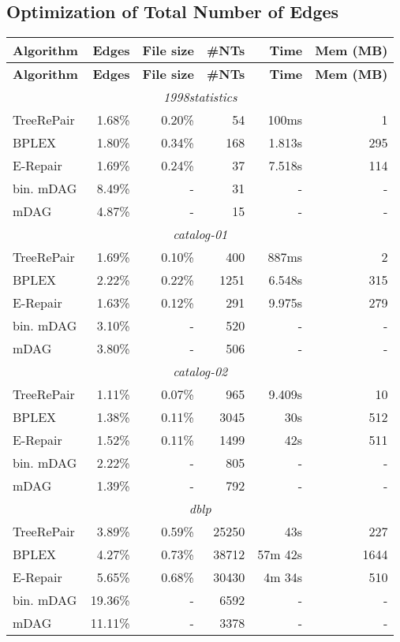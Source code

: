 \documentclass[12pt]{llncs}
\begin{document}
\subsection{Optimization of Total Number of Edges}\label{sec:detailedResultsOptimizationEdges}

\begin{longtable}{lrrrrr}
			\toprule
\textbf{Algorithm}&\textbf{Edges}&\textbf{File size}&\textbf{\#NTs}&\textbf{Time}&\textbf{Mem (MB)}\\\midrule
\endhead
			\toprule
\textbf{Algorithm}&\textbf{Edges}&\textbf{File size}&\textbf{\#NTs}&\textbf{Time}&\textbf{Mem (MB)}\\
\endfirsthead
			\midrule\multicolumn{6}{c}{\emph{1998statistics}}\\*
			TreeRePair&1.68\%&0.20\%&54&100ms&1\\*
			BPLEX&1.80\%&0.34\%&168&1.813s&295\\*
			E-Repair&1.69\%&0.24\%&37&7.518s&114\\*
			bin. mDAG&8.49\%&-&31&-&-\\*
			mDAG&4.87\%&-&15&-&-\\
			\midrule\multicolumn{6}{c}{\emph{catalog-01}}\\*
			TreeRePair&1.69\%&0.10\%&400&887ms&2\\*
			BPLEX&2.22\%&0.22\%&1251&6.548s&315\\*
			E-Repair&1.63\%&0.12\%&291&9.975s&279\\*
			bin. mDAG&3.10\%&-&520&-&-\\*
			mDAG&3.80\%&-&506&-&-\\
			\midrule\multicolumn{6}{c}{\emph{catalog-02}}\\*
			TreeRePair&1.11\%&0.07\%&965&9.409s&10\\*
			BPLEX&1.38\%&0.11\%&3045&30s&512\\*
			E-Repair&1.52\%&0.11\%&1499&42s&511\\*
			bin. mDAG&2.22\%&-&805&-&-\\*
			mDAG&1.39\%&-&792&-&-\\
			\midrule\multicolumn{6}{c}{\emph{dblp}}\\*
			TreeRePair&3.89\%&0.59\%&25250&43s&227\\*
			BPLEX&4.27\%&0.73\%&38712&57m 42s&1644\\*
			E-Repair&5.65\%&0.68\%&30430&4m 34s&510\\*
			bin. mDAG&19.36\%&-&6592&-&-\\*
			mDAG&11.11\%&-&3378&-&-\\

\end{longtable}
\end{document}
